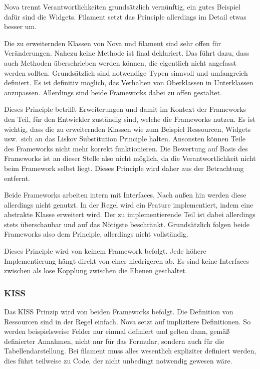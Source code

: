 Nova trennt Verantwortlichkeiten grundsätzlich vernünftig, ein gutes Beispiel dafür sind die Widgets.
Filament setzt das Principle allerdings im Detail etwas besser um.

Die zu erweiternden Klassen von Nova und filament sind sehr offen für Veränderungen.
Nahezu keine Methode ist final deklariert.
Das führt dazu, dass auch Methoden überschrieben werden können, die eigentlich nicht angefasst werden sollten.
Grundsätzlich sind notwendige Typen sinnvoll und umfangreich definiert.
Es ist definitiv möglich, das Verhalten von Oberklassen in Unterklassen anzupassen.
Allerdings sind beide Frameworks dabei zu offen gestaltet.

Dieses Principle betrifft Erweiterungen und damit im Kontext der Frameworks den Teil, für den Entwickler zuständig sind, welche die Frameworks nutzen.
Es ist wichtig, dass die zu erweiternden Klassen wie zum Beispiel Ressourcen, Widgets usw.\ sich an das Liskov Substitution Principle halten.
Ansonsten können Teile des Frameworks nicht mehr korrekt funktionieren.
Die Bewertung auf Basis des Frameworks ist an dieser Stelle also nicht möglich, da die Verantwortlichkeit nicht beim Framework selbst liegt.
Dieses Principle wird daher aus der Betrachtung entfernt.

Beide Frameworks arbeiten intern mit Interfaces.
Nach außen hin werden diese allerdings nicht genutzt.
In der Regel wird ein Feature implementiert, indem eine abstrakte Klasse erweitert wird.
Der zu implementierende Teil ist dabei allerdings stets überschaubar und auf das Nötigste beschränkt.
Grundsätzlich folgen beide Frameworks also dem Principle, allerdings nicht vollständig.

Dieses Principle wird von keinem Framework befolgt.
Jede höhere Implementierung hängt direkt von einer niedrigeren ab.
Es sind keine Interfaces zwischen als lose Kopplung zwischen die Ebenen geschaltet.

\subsubsection{KISS}
Das KISS Prinzip wird von beiden Frameworks befolgt.
Die Definition von Ressourcen sind in der Regel einfach.
Nova setzt auf implizitere Definitionen.
So werden beispielsweise Felder nur einmal definiert und gelten dann, gemäß definierter Annahmen, nicht nur für das Formular, sondern auch für die Tabellendarstellung.
Bei filament muss alles wesentlich expliziter definiert werden, dies führt teilweise zu Code, der nicht unbedingt notwendig gewesen wäre.

